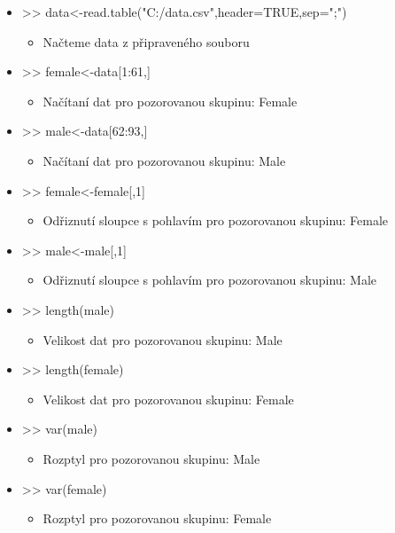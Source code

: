 \documentclass[paper=a4, fontsize=12pt]{scrartcl}
\numberwithin{equation}{section}		%
\numberwithin{figure}{section}			%
\numberwithin{table}{section}				%
\begin{document}
\begin{itemize}
	\item >> data<-read.table("C:/data.csv",header=TRUE,sep=";") %
		\begin{itemize}
		\item Načteme data z připraveného souboru
		\end{itemize}
	\item >> female<-data[1:61,]
		\begin{itemize}
		\item Načítaní dat pro pozorovanou skupinu: Female
		\end{itemize}
	\item >> male<-data[62:93,]
		\begin{itemize}
		\item Načítaní dat pro pozorovanou skupinu: Male
		\end{itemize}
	\item >> female<-female[,1] %
		\begin{itemize}
		\item Odřiznutí sloupce s pohlavím pro pozorovanou skupinu: Female
		\end{itemize}
	\item >> male<-male[,1]
		\begin{itemize}
		\item Odřiznutí sloupce s pohlavím pro pozorovanou skupinu: Male
		\end{itemize}
	\item >> length(male)
		\begin{itemize}
		\item Velikost dat pro pozorovanou skupinu: Male
		\end{itemize}
	\item >> length(female)
		\begin{itemize}
		\item Velikost dat pro pozorovanou skupinu: Female
		\end{itemize}
	\item >> var(male)
		\begin{itemize}
		\item Rozptyl pro pozorovanou skupinu: Male
		\end{itemize}
	\item >> var(female)
		\begin{itemize}
		\item Rozptyl pro pozorovanou skupinu: Female

\end{itemize}
\end{itemize}
\end{document}

